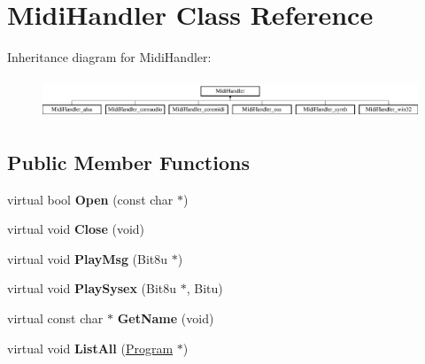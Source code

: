 \hypertarget{classMidiHandler}{\section{Midi\-Handler Class Reference}
\label{classMidiHandler}
}
Inheritance diagram for Midi\-Handler\-:\begin{figure}[H]
\begin{center}
\leavevmode
\includegraphics[height=1.220044cm]{classMidiHandler}
\end{center}
\end{figure}
\subsection*{Public Member Functions}
\begin{DoxyCompactItemize}
\item 
\hypertarget{classMidiHandler_aaac23e165375be912b77ab5d354ff8c1}{virtual bool {\bfseries Open} (const char $\ast$)}\label{classMidiHandler_aaac23e165375be912b77ab5d354ff8c1}

\item 
\hypertarget{classMidiHandler_a452affdc7cbccf4fbe60a574fb615575}{virtual void {\bfseries Close} (void)}\label{classMidiHandler_a452affdc7cbccf4fbe60a574fb615575}

\item 
\hypertarget{classMidiHandler_acd62ebefbe21ef89185897f571e39504}{virtual void {\bfseries Play\-Msg} (Bit8u $\ast$)}\label{classMidiHandler_acd62ebefbe21ef89185897f571e39504}

\item 
\hypertarget{classMidiHandler_aed229d871437ff05ff4e0b4ef12ff4a1}{virtual void {\bfseries Play\-Sysex} (Bit8u $\ast$, Bitu)}\label{classMidiHandler_aed229d871437ff05ff4e0b4ef12ff4a1}

\item 
\hypertarget{classMidiHandler_ac19f542b9af06067b69a2e518a86c443}{virtual const char $\ast$ {\bfseries Get\-Name} (void)}\label{classMidiHandler_ac19f542b9af06067b69a2e518a86c443}

\item 
\hypertarget{classMidiHandler_aac16733a77bb5de1f3e9efc453a5848a}{virtual void {\bfseries List\-All} (\hyperlink{classProgram}{Program} $\ast$)}\label{classMidiHandler_aac16733a77bb5de1f3e9efc453a5848a}

\end{DoxyCompactItemize}
